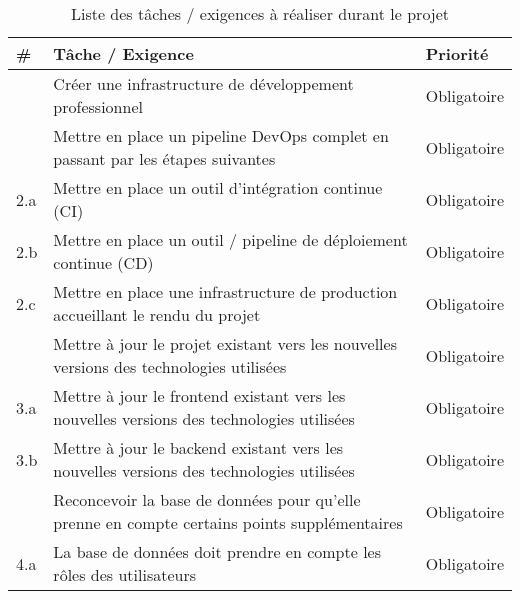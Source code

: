 \documentclass[
    iai, %
    il, %
]{heig-tb}
\begin{document}
\begin{table}[h]
    \begin{center}
        \caption{Liste des tâches / exigences à réaliser durant le projet \label{taches}}
        \begin{tabularx}{0.8\textwidth} {
                | >{\centering\arraybackslash}X
                | >{\centering\arraybackslash}X
                | >{\centering\arraybackslash}X |}
            \#  & Tâche / Exigence                                                                                                       & Priorité      \\ \hline
            1   & Créer une infrastructure de développement professionnel                                                                & Obligatoire   \\
            2   & Mettre en place un pipeline DevOps complet en passant par les étapes suivantes                                         & Obligatoire   \\
            2.a & Mettre en place un outil d'intégration continue (CI)                                                                   & Obligatoire   \\
            2.b & Mettre en place un outil / pipeline de déploiement continue (CD)                                                       & Obligatoire   \\
            2.c & Mettre en place une infrastructure de production accueillant le rendu du projet                                        & Obligatoire   \\
            3   & Mettre à jour le projet existant vers les nouvelles versions des technologies utilisées                                & Obligatoire   \\
            3.a & Mettre à jour le frontend existant vers les nouvelles versions des technologies utilisées                              & Obligatoire   \\
            3.b & Mettre à jour le backend existant vers les nouvelles versions des technologies utilisées                               & Obligatoire   \\
            4   & Reconcevoir la base de données pour qu'elle prenne en compte certains points supplémentaires                           & Obligatoire   \\
            4.a & La base de données doit prendre en compte les rôles des utilisateurs                                                   & Obligatoire   \\

\end{tabularx}
\end{center}
\end{table}
\end{document}
